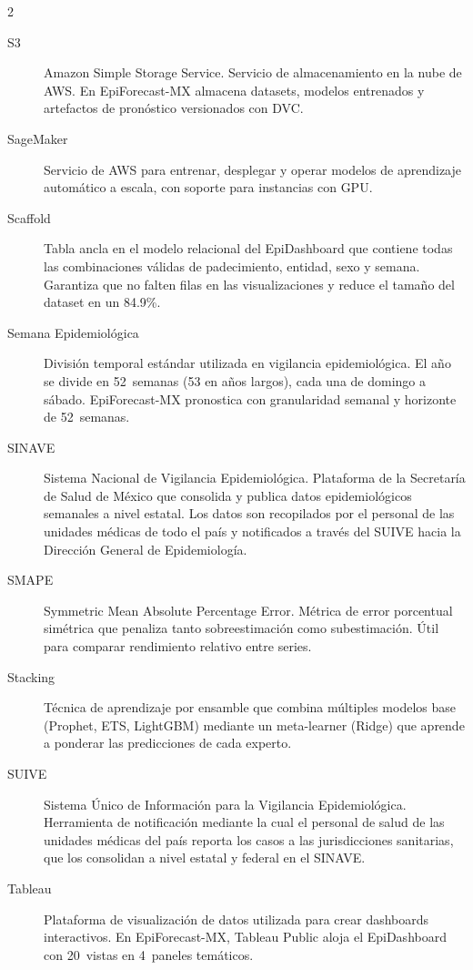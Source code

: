 \documentclass[12pt, letterpaper]{article}
\begin{document}
\begin{multicols}{2}
\begin{description}
\item[S3]
Amazon Simple Storage Service. Servicio de almacenamiento en la nube de AWS. En EpiForecast-MX almacena datasets, modelos entrenados y artefactos de pronóstico versionados con DVC.

\item[SageMaker]
Servicio de AWS para entrenar, desplegar y operar modelos de aprendizaje automático a escala, con soporte para instancias con GPU.

\item[Scaffold]
Tabla ancla en el modelo relacional del EpiDashboard que contiene todas las combinaciones válidas de padecimiento, entidad, sexo y semana. Garantiza que no falten filas en las visualizaciones y reduce el tamaño del dataset en un 84.9\%.

\item[Semana Epidemiológica]
División temporal estándar utilizada en vigilancia epidemiológica. El año se divide en 52~semanas (53 en años largos), cada una de domingo a sábado. EpiForecast-MX pronostica con granularidad semanal y horizonte de 52~semanas.

\item[SINAVE]
Sistema Nacional de Vigilancia Epidemiológica. Plataforma de la Secretaría de Salud de México que consolida y publica datos epidemiológicos semanales a nivel estatal. Los datos son recopilados por el personal de las unidades médicas de todo el país y notificados a través del SUIVE hacia la Dirección General de Epidemiología.

\item[SMAPE]
Symmetric Mean Absolute Percentage Error. Métrica de error porcentual simétrica que penaliza tanto sobreestimación como subestimación. Útil para comparar rendimiento relativo entre series.

\item[Stacking]
Técnica de aprendizaje por ensamble que combina múltiples modelos base (Prophet, ETS, LightGBM) mediante un meta-learner (Ridge) que aprende a ponderar las predicciones de cada experto.

\item[SUIVE]
Sistema Único de Información para la Vigilancia Epidemiológica. Herramienta de notificación mediante la cual el personal de salud de las unidades médicas del país reporta los casos a las jurisdicciones sanitarias, que los consolidan a nivel estatal y federal en el SINAVE.

\item[Tableau]
Plataforma de visualización de datos utilizada para crear dashboards interactivos. En EpiForecast-MX, Tableau Public aloja el EpiDashboard con 20~vistas en 4~paneles temáticos.


\end{description}
\end{multicols}
\end{document}

